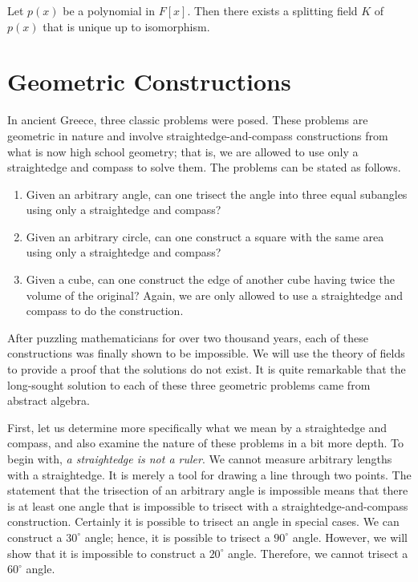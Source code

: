\begin{corollary}\label{fields:splitting_field_corollary}
Let $p(x)$ be a polynomial in $F[x]$. Then there exists a splitting
field $K$ of $p(x)$ that is unique up to isomorphism. 
\end{corollary}


 
\section{Geometric Constructions}


In ancient Greece, three classic problems were posed. These problems
are geometric in nature and involve straightedge-and-compass
constructions from what is now high school geometry; that is, we are
allowed to use only a straightedge and compass to solve them. The
problems can be stated as follows.    
\begin{enumerate}

\item
Given an arbitrary angle, can one trisect the angle into three equal
subangles using only a straightedge and compass?

\item
Given an arbitrary circle, can one construct a square with the same
area using only a straightedge and compass?

\item
Given a cube, can one construct the edge of another cube having twice
the volume of the original? Again, we are only allowed to use a
straightedge and compass to do the construction.

\end{enumerate}
After puzzling mathematicians for over two thousand years, each of
these constructions was finally shown to be impossible.  We will use
the theory of fields to provide a proof that the solutions do not
exist.  It is quite remarkable that the long-sought solution to each
of these three geometric problems came from abstract algebra.  


First, let us determine more specifically what we mean by a
straightedge and compass, and also examine the nature of these
problems in a bit more depth.  To begin with, {\em a straightedge is
not a ruler}. We cannot measure arbitrary lengths with a straightedge.
It is merely a tool for drawing a line through two points. The
statement that the trisection of an arbitrary angle is impossible
means that there is at least one angle that is impossible to trisect
with a straightedge-and-compass construction. Certainly it is
possible to trisect an angle in special cases.  We can construct a
$30^\circ$ angle; hence, it is possible to trisect a $90^\circ$
angle.  However, we will show that it is impossible to construct a 
$20^\circ$ angle.  Therefore, we cannot trisect a $60^\circ$ angle. 

